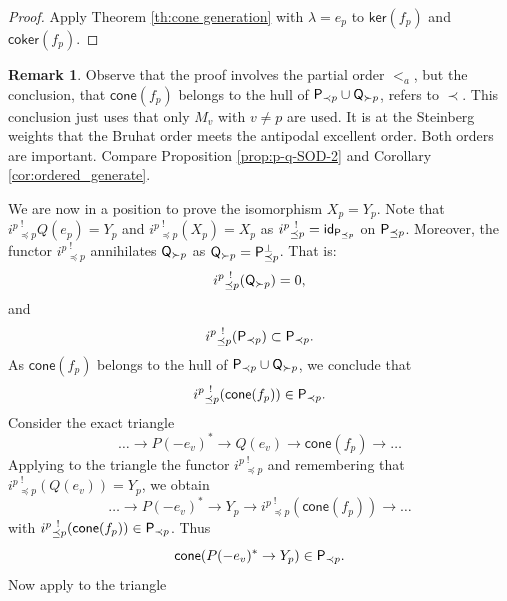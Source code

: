 \documentclass[sn-mathphys-num]{sn-jnl}%
\newcommand{\coker}{{\mathsf{coker}}}
\newcommand{\cone}{{\mathsf{cone}}}
\newcommand{\kernel}{{\mathsf{ker}}}
\theoremstyle{definition}
\newtheorem{remark}[theorem]{Remark}
\begin{document}
\begin{proof}
Apply Theorem \ref{th:cone generation} with $\lambda=e_p$ to 
$\kernel(f_p)$ and $\coker(f_p)$.
\end{proof}
\begin{remark}
    Observe that the proof involves the partial order $<_a$, but the conclusion, that $\cone(f_p)$ belongs to the hull of $ {\sf P}_{\prec p}\cup {\sf Q}_{\succ p}$, refers to $\prec$. This conclusion just
    uses that only $M_v$ with $v\neq p$ are used. It is at the Steinberg weights that the Bruhat order meets the antipodal excellent order. Both orders are important. Compare Proposition \ref{prop:p-q-SOD-2} and Corollary \ref{cor:ordered_generate}.
\end{remark}
We are now in a position to prove the isomorphism $X_p=Y_p$. 
Note that ${i^p}_{\preceq p}^{\ !}Q(e_p)=Y_p$ and ${i^p}_{\preceq p}^{\ !}(X_p)=X_p$ as ${i^p}_{\preceq p}^{\ !}={\sf id}_{{\sf P}_{\preceq p}}$ on ${\sf P}_{\preceq p}$. 
Moreover, the functor ${i^p}_{\preceq p}^{\ !}$ annihilates ${\sf Q}_{\succ p}$
as ${\sf Q}_{\succ p}={\sf P}_{\preceq p}^{\perp}$. That is:
\begin{eqnarray*}
{i^p}_{\preceq p}^{\ !}({\sf Q}_{\succ p})=0,
\end{eqnarray*}
and 
\begin{eqnarray*}
{i^p}_{\preceq p}^{\ !}({\sf P}_{\prec p})\subset {\sf P}_{\prec p}.
\end{eqnarray*}
As $\cone(f_p)$ belongs to the hull of $ {\sf P}_{\prec p}\cup {\sf Q}_{\succ p}$, we conclude that \begin{eqnarray}{i^p}_{\preceq p}^{\ !}(\cone(f_p))\in {\sf P}_{\prec p}.\end{eqnarray}
Consider the exact triangle 
\begin{equation}
\dots \rightarrow P(-e_v)^*\rightarrow Q(e_v)\rightarrow \cone(f_p)\rightarrow \dots 
\end{equation}
Applying to the triangle the functor ${i^p}_{\preceq p}^{\ !}$ and remembering 
that ${i^p}_{\preceq p}^{\ !}(Q(e_v))=Y_p$, we obtain 
\begin{equation}
\dots \rightarrow P(-e_v)^*\rightarrow Y_p\rightarrow {i^p}_{\preceq p}^{\ !}(\cone(f_p))\rightarrow \dots 
\end{equation}
with ${i^p}_{\preceq p}^{\ !}(\cone(f_p))\in {\sf P}_{\prec p}$.
Thus
\begin{equation}\label{eq:cone in P} \cone(P(-e_v)^*\rightarrow Y_p)\in  {\sf P}_{\prec p}.
\end{equation} 
Now apply to the triangle 
\end{document}
